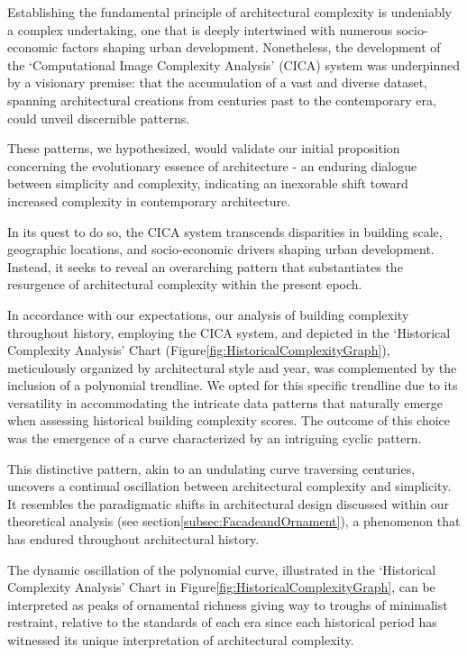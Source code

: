 Establishing the fundamental principle of architectural complexity is undeniably a complex undertaking, one that is deeply intertwined with numerous socio-economic factors shaping urban development.
Nonetheless, the development of the `Computational Image Complexity Analysis' (CICA) system was underpinned by a visionary premise: that the accumulation of a vast and diverse dataset, spanning architectural creations from centuries past to the contemporary era, could unveil discernible patterns.

These patterns, we hypothesized, would validate our initial proposition concerning the evolutionary essence of architecture - an enduring dialogue between simplicity and complexity, indicating an inexorable shift toward increased complexity in contemporary architecture.

In its quest to do so, the CICA system transcends disparities in building scale, geographic locations, and socio-economic drivers shaping urban development.
Instead, it seeks to reveal an overarching pattern that substantiates the resurgence of architectural complexity within the present epoch.

In accordance with our expectations, our analysis of building complexity throughout history, employing the CICA system, and depicted in the `Historical Complexity Analysis' Chart (Figure\ref{fig:HistoricalComplexityGraph}), meticulously organized by architectural style and year, was complemented by the inclusion of a polynomial trendline.
We opted for this specific trendline due to its versatility in accommodating the intricate data patterns that naturally emerge when assessing historical building complexity scores.
The outcome of this choice was the emergence of a curve characterized by an intriguing cyclic pattern.

This distinctive pattern, akin to an undulating curve traversing centuries, uncovers a continual oscillation between architectural complexity and simplicity.
It resembles the paradigmatic shifts in architectural design discussed within our theoretical analysis (see section\ref{subsec:FacadeandOrnament}), a phenomenon that has endured throughout architectural history.

The dynamic oscillation of the polynomial curve, illustrated in the `Historical Complexity Analysis' Chart in Figure\ref{fig:HistoricalComplexityGraph}, can be interpreted as peaks of ornamental richness giving way to troughs of minimalist restraint, relative to the standards of each era since each historical period has witnessed its unique interpretation of architectural complexity.

